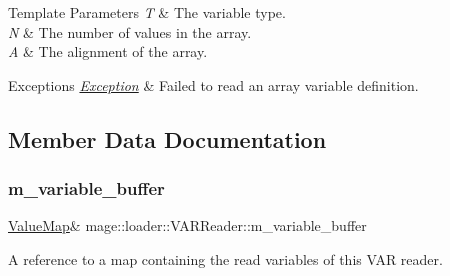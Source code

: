 \begin{DoxyTemplParams}{Template Parameters}
{\em T} & The variable type. \\
\hline
{\em N} & The number of values in the array. \\
\hline
{\em A} & The alignment of the array. \\
\hline
\end{DoxyTemplParams}

\begin{DoxyExceptions}{Exceptions}
{\em \mbox{\hyperlink{classmage_1_1_exception}{Exception}}} & Failed to read an array variable definition. \\
\hline
\end{DoxyExceptions}


\subsection{Member Data Documentation}
\mbox{\label{classmage_1_1loader_1_1_v_a_r_reader_ae5f9a2c2d74f38bce7d52ea359a52c52}} 
\subsubsection{\texorpdfstring{m\+\_\+variable\+\_\+buffer}{m\_variable\_buffer}}
{\footnotesize\ttfamily \mbox{\hyperlink{namespacemage_a3a4b59e486babe3ec78455f9ee0d4beb}{Value\+Map}}\& mage\+::loader\+::\+V\+A\+R\+Reader\+::m\+\_\+variable\+\_\+buffer\hspace{0.3cm}{\ttfamily [private]}}

A reference to a map containing the read variables of this V\+AR reader. 